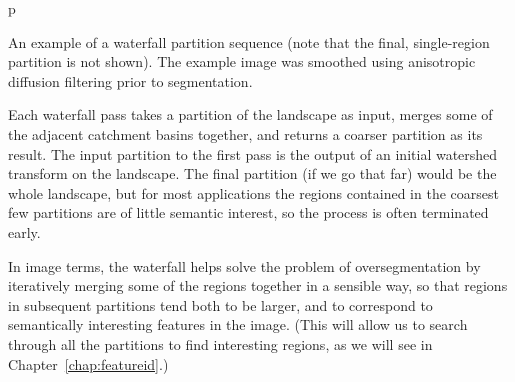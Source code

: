 \begin{stusubfig}{p}
	\hspace{4mm}%
	\hspace{4mm}%
\caption[An example of a waterfall partition sequence]{An example of a waterfall partition sequence (note that the final, single-region partition is not shown). The example image was smoothed using anisotropic diffusion filtering prior to segmentation.}
\label{fig:segmentation-waterfall-partitionsequence}
\end{stusubfig}

Each waterfall pass takes a partition of the landscape as input, merges some of the adjacent catchment basins together, and returns a coarser partition as its result. The input partition to the first pass is the output of an initial watershed transform on the landscape. The final partition (if we go that far) would be the whole landscape, but for most applications the regions contained in the coarsest few partitions are of little semantic interest, so the process is often terminated early.

In image terms, the waterfall helps solve the problem of oversegmentation by iteratively merging some of the regions together in a sensible way, so that regions in subsequent partitions tend both to be larger, and to correspond to semantically interesting features in the image. (This will allow us to search through all the partitions to find interesting regions, as we will see in Chapter~\ref{chap:featureid}.)

